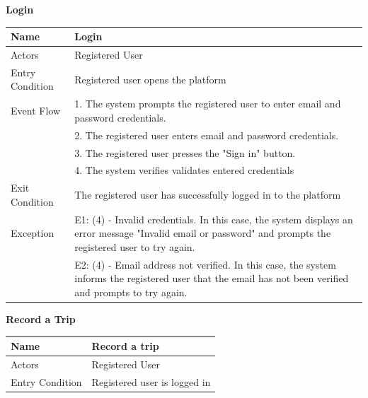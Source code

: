\begin{enumerate}[label=\textbf{[UC\arabic*]}]
    \item \textbf{Login} 
        \begin{center}
            \begin{tabular}{|p{4cm}|p{11cm}|}
                \hline
                \textbf{Name} & \textbf{Login} \\
                \hline
                Actors & Registered User \\
                \hline
                Entry Condition & Registered user opens the platform \\
                \hline
                Event Flow & 1. The system prompts the registered user to enter email and password credentials. \\
                & 2. The registered user enters email and password credentials. \\
                & 3. The registered user presses the "Sign in" button. \\
                & 4. The system verifies validates entered credentials \\
                \hline
                Exit Condition & The registered user has successfully logged in to the platform \\
                \hline
                Exception & E1: (4) - Invalid credentials. \newline In this case, the system displays an error message "Invalid email or password" and prompts the registered user to try again.\\
                & E2: (4) - Email address not verified. \newline In this case, the system informs the registered user that the email has not been verified and prompts to try again.\\
                \hline
            \end{tabular}
        \end{center}
\newpage
    \item \textbf{Record a Trip} 
        \begin{center}
            \begin{tabular}{|p{4cm}|p{11cm}|}
                \hline
                \textbf{Name} & \textbf{Record a trip} \\
                \hline
                Actors & Registered User \\
                \hline
                Entry Condition & Registered user is logged in \\

\end{tabular}
\end{center}
\end{enumerate}
